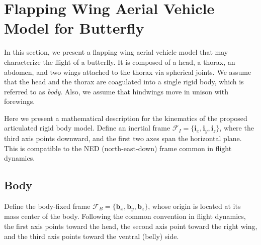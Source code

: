 \documentclass[conf]{new-aiaa}
\begin{document}
\section{Flapping Wing Aerial Vehicle Model for Butterfly}\label{sec:FWAV}

In this section, we present a flapping wing aerial vehicle model that may characterize the flight of a butterfly.
It is composed of a head, a thorax, an abdomen, and two wings attached to the thorax via spherical joints. 
We assume that the head and the thorax are coagulated into a single rigid body, which is referred to as \textit{body}. 
Also, we assume that hindwings move in unison with forewings.

Here we present a mathematical description for the kinematics of the proposed articulated rigid body model.
Define an inertial frame $\mathcal{F}_I=\{\mathbf{i}_x,\mathbf{i}_y,\mathbf{i}_z\}$, where the third axis points downward, and the first two axes span the horizontal plane. 
This is compatible to the NED (north-east-down) frame common in flight dynamics.

\subsection{Body}

Define the body-fixed frame $\mathcal{F}_B=\{\mathbf{b}_x,\mathbf{b}_y,\mathbf{b}_z\}$,
whose origin is located at its mass center of the body.
Following the common convention in flight dynamics, the first axis points toward the head, the second axis point toward the right wing, and the third axis points toward the ventral (belly) side.
\end{document}
